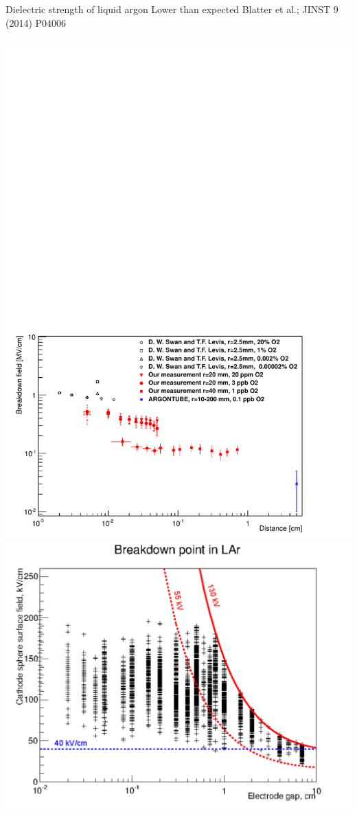 \documentclass[]{beamer}
\newcommand*{\emphcoltitle}{blue}
\begin{document}
\begin{frame}{Dielectric strength of liquid argon}{\color{\emphcoltitle} Lower than expected}
	{\tiny Blatter et al.; JINST 9 (2014) P04006~\cite{breakdown_14}}
	\begin{columns}[c]
		\centering
		\includegraphics[viewport=18 10 511 351, clip, width=\textwidth]{defence/breakdown_plot}
		\centering
		\includegraphics[width=\textwidth]{defence/breakdown_summary}
	\end{columns}
\end{frame}
\end{document}
